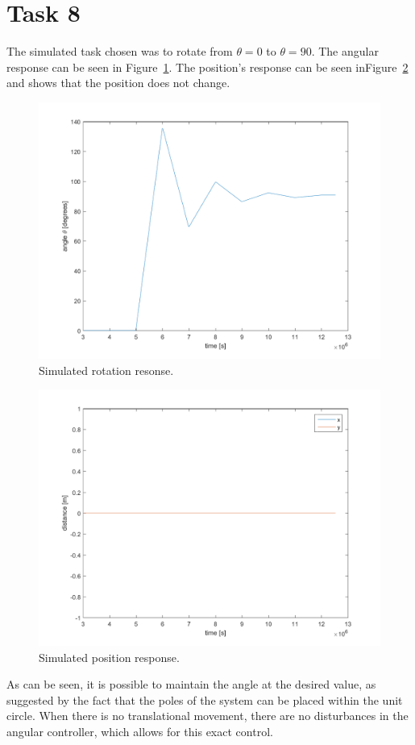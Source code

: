 \documentclass[a4paper,12pt,oneside,onecolumn]{article} %
\begin{document}
\section*{Task 8}
    The simulated task chosen was to rotate from $\theta = 0$ to $\theta = 90$.
    The angular response can be seen in Figure~\ref{fig:task8_angleplot}. The
    position's response can be seen inFigure~\ref{fig:task8_posplot} and shows
    that the position does not change.  \begin{figure}[H]
        \centering
        \includegraphics[scale = 0.5]{../matlab/images/task8_angleplot.png}
        \caption{Simulated rotation resonse.}
        \label{fig:task8_angleplot}
    \end{figure}
    \begin{figure}[H]
        \centering
        \includegraphics[scale = 0.5]{../matlab/images/task8_posplot.png}
        \caption{Simulated position response.}
        \label{fig:task8_posplot}
    \end{figure}
As can be seen, it is possible to maintain the angle at the desired value, as suggested by the fact that the poles of the system can be placed within the unit circle. When there is no translational movement, there are no disturbances in the angular controller, which allows for this exact control.
\end{document}
